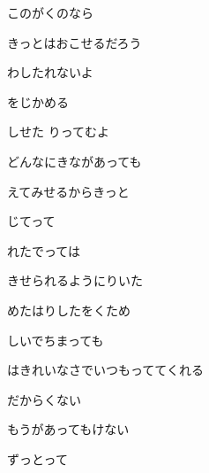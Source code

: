 \documentclass[14pt]{extreport}
\begin{document}
{  このがくのなら
  \jisho{}

  きっとはおこせるだろう
  \jisho{}

\item
  わしたれないよ
  \jisho{}

  をじかめる
  \jisho{}

  しせた りってむよ
  \jisho{}

  どんなにきながあっても
  \jisho{}

  えてみせるからきっと
  \jisho{}

  じてって
  \jisho{}

\item
  れたでっては
  \jisho{}

  きせられるようにりいた
  \jisho{}

\item
  めたはりしたをくため
  \jisho{}

  しいでちまっても
  \jisho{}

  はきれいなさでいつもっててくれる
  \jisho{}

  だからくない
  \jisho{}

  もうがあってもけない
  \jisho{}

\item
  ずっとって
  \jisho{}

}
\end{document}
